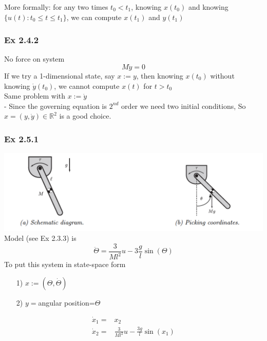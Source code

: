 \documentclass[letterpaper]{article}
\begin{document}
More formally: for any two times $t_0<t_1$, knowing $x(t_0)$ and knowing $\{u(t): t_0 \leq t\leq t_1\}$, we can compute $x(t_1)$ and $y(t_1)$

\subsubsection*{Ex 2.4.2}
No force on system $$M\ddot y=0$$
If we try a 1-dimensional state, say $x:=y$, then knowing $x(t_0)$ without knowing $\dot y(t_0)$, we cannot compute $x(t)$ for $t>t_0$\\
Same problem with $x:=\dot y$\\
- Since the governing equation is $2^{nd}$ order we need two initial conditions, So $x=(y,\dot y)\in \mathbb{R}^2$ is a good choice.

\subsubsection*{Ex 2.5.1}
\includegraphics[scale=0.9]{images/Ex2_5_1.png}\\
Model (see Ex 2.3.3) is 
$$\ddot \Theta = \frac{3}{Ml^2}u-3\frac{g}{l}\sin(\Theta)$$
To put this system in state-space form\\
\begin{enumerate}
	\item[1)] $x:=(\Theta, \dot \Theta)$
	\item[2)] $y=$angular position=$\Theta$
\end{enumerate}
\begin{align*}
	\dot x_1= & x_2                                   \\
	\dot x_2= & \frac{3}{Ml^2}u-\frac{3g}{l}\sin(x_1) 
\end{align*}
\end{document}
